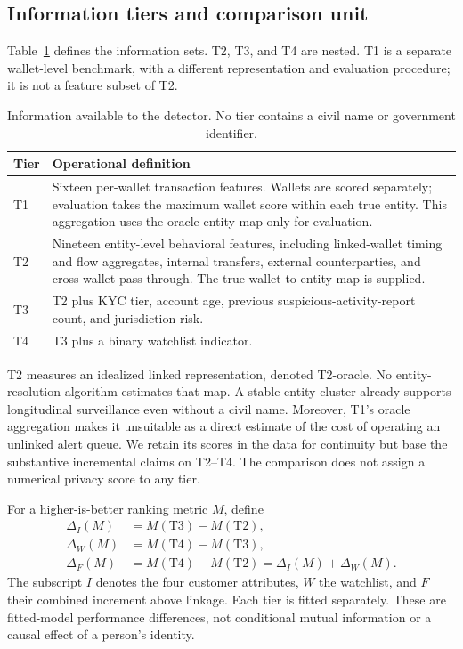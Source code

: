 \documentclass[11pt,a4paper]{article}
\begin{document}
\subsection{Information tiers and comparison unit}
Table~\ref{tab:tiers} defines the information sets. T2, T3, and T4 are nested. T1 is a separate wallet-level benchmark, with a different representation and evaluation procedure; it is not a feature subset of T2.
\begin{table}[htbp]\centering\small
\caption{Information available to the detector. No tier contains a civil name or government identifier.}\label{tab:tiers}
\begin{tabularx}{\linewidth}{lX}\toprule
Tier & Operational definition \\\midrule
T1 & Sixteen per-wallet transaction features. Wallets are scored separately; evaluation takes the maximum wallet score within each true entity. This aggregation uses the oracle entity map only for evaluation. \\
T2 & Nineteen entity-level behavioral features, including linked-wallet timing and flow aggregates, internal transfers, external counterparties, and cross-wallet pass-through. The true wallet-to-entity map is supplied. \\
T3 & T2 plus KYC tier, account age, previous suspicious-activity-report count, and jurisdiction risk. \\
T4 & T3 plus a binary watchlist indicator. \\\bottomrule
\end{tabularx}
\end{table}

T2 measures an idealized linked representation, denoted T2-oracle. No entity-resolution algorithm estimates that map. A stable entity cluster already supports longitudinal surveillance even without a civil name. Moreover, T1's oracle aggregation makes it unsuitable as a direct estimate of the cost of operating an unlinked alert queue. We retain its scores in the data for continuity but base the substantive incremental claims on T2--T4. The comparison does not assign a numerical privacy score to any tier.

For a higher-is-better ranking metric $M$, define
\begin{align}
\Delta_I(M)&=M(\mathrm{T3})-M(\mathrm{T2}),\\
\Delta_W(M)&=M(\mathrm{T4})-M(\mathrm{T3}),\\
\Delta_F(M)&=M(\mathrm{T4})-M(\mathrm{T2})=\Delta_I(M)+\Delta_W(M).
\end{align}
The subscript $I$ denotes the four customer attributes, $W$ the watchlist, and $F$ their combined increment above linkage. Each tier is fitted separately. These are fitted-model performance differences, not conditional mutual information or a causal effect of a person's identity.
\end{document}
